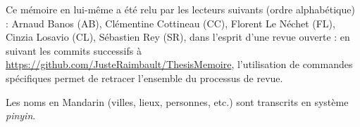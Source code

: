 Ce mémoire en lui-même a été relu par les lecteurs suivants (ordre alphabétique) : Arnaud Banos (AB), Clémentine Cottineau (CC), Florent Le Néchet (FL), Cinzia Losavio (CL), Sébastien Rey (SR), dans l'esprit d'une revue ouverte : en suivant les commits successifs à \url{https://github.com/JusteRaimbault/ThesisMemoire}, l'utilisation de commandes spécifiques permet de retracer l'ensemble du processus de revue.

Les noms en Mandarin (villes, lieux, personnes, etc.) sont transcrits en système \emph{pinyin}.




\endgroup			

\vfill










